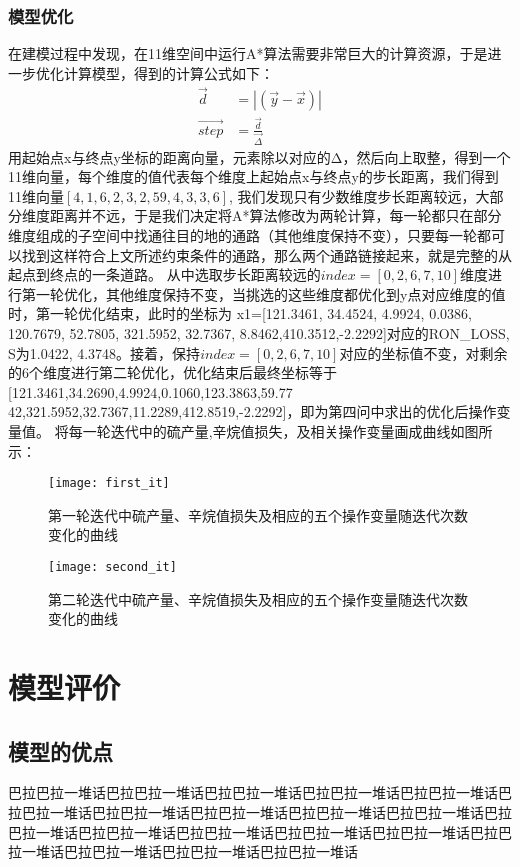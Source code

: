 \documentclass[bwprint]{gmcmthesis}
\begin{document}
\subsubsection{模型优化}
在建模过程中发现，在11维空间中运行A*算法需要非常巨大的计算资源，于是进一步优化计算模型，得到的计算公式如下：
\begin{align}
\vec{d }&=\left | \left ( \vec{y}-\vec{x} \right ) \right |\\
\overrightarrow{step }&= \frac{\vec{d }}{\overrightarrow{\Delta} }
\end{align}
用起始点x与终点y坐标的距离向量，元素除以对应的Δ，然后向上取整，得到一个11维向量，每个维度的值代表每个维度上起始点x与终点y的步长距离，我们得到11维向量\:$[4, 1, 6, 2, 3, 2, 59, 4, 3, 3, 6]$,
我们发现只有少数维度步长距离较远，大部分维度距离并不远，于是我们决定将A*算法修改为两轮计算，每一轮都只在部分维度组成的子空间中找通往目的地的通路（其他维度保持不变），只要每一轮都可以找到这样符合上文所述约束条件的通路，那么两个通路链接起来，就是完整的从起点到终点的一条道路。
从中选取步长距离较远的$index=[0,2,6,7,10]$维度进行第一轮优化，其他维度保持不变，当挑选的这些维度都优化到y点对应维度的值时，第一轮优化结束，此时的坐标为
x1=[121.3461, 34.4524, 4.9924, 0.0386, 120.7679, 52.7805, 321.5952, 32.7367, 8.8462,410.3512,-2.2292]对应的RON\_LOSS,  S为1.0422, 4.3748。接着，保持$index=[0,2,6,7,10]$对应的坐标值不变，对剩余的6个维度进行第二轮优化，优化结束后最终坐标等于[121.3461,34.2690,4.9924,0.1060,123.3863,59.77
42,321.5952,32.7367,11.2289,412.8519,-2.2292]，即为第四问中求出的优化后操作变量值。
将每一轮迭代中的硫产量,辛烷值损失，及相关操作变量画成曲线如图所示：
\begin{figure}[htb]
	\centering
	\texttt{[image: first\_it]}
	\caption{第一轮迭代中硫产量、辛烷值损失及相应的五个操作变量随迭代次数变化的曲线}
\end{figure}


\begin{figure}[htb]
	\centering
	\texttt{[image: second\_it]}
	\caption{第二轮迭代中硫产量、辛烷值损失及相应的五个操作变量随迭代次数变化的曲线}
\end{figure}


\FloatBarrier
\section{模型评价}


\FloatBarrier
\subsection{模型的优点}
巴拉巴拉一堆话巴拉巴拉一堆话巴拉巴拉一堆话巴拉巴拉一堆话巴拉巴拉一堆话巴拉巴拉一堆话巴拉巴拉一堆话巴拉巴拉一堆话巴拉巴拉一堆话巴拉巴拉一堆话巴拉巴拉一堆话巴拉巴拉一堆话巴拉巴拉一堆话巴拉巴拉一堆话巴拉巴拉一堆话巴拉巴拉一堆话巴拉巴拉一堆话巴拉巴拉一堆话巴拉巴拉一堆话
\end{document}
